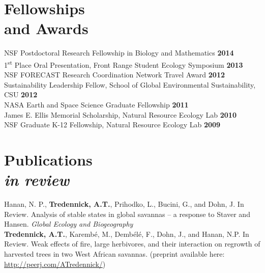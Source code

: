 \documentclass[margin,line]{resume}
\begin{document}
\begin{resume}
    \section{\mysidestyle Fellowships \\and Awards} 
                NSF Postdoctoral Research Fellowship in Biology and Mathematics    \hfill \textbf{2014}\vspace{.5mm}\\%
                1\textsuperscript{st} Place Oral Presentation, Front Range Student Ecology Symposium  \hfill \textbf{2013}\vspace{.5mm}\\%
                NSF FORECAST Research Coordination Network Travel Award \hfill \textbf{2012}\vspace{.5mm}\\%
                Sustainability Leadership Fellow, School of Global Environmental Sustainability, CSU \hfill \textbf{2012}\vspace{.5mm}\\%
		NASA Earth and Space Science Graduate Fellowship  \hfill \textbf{2011}\vspace{.5mm}\\%
		James E. Ellis Memorial Scholarship, Natural Resource Ecology Lab  \hfill \textbf{2010}\vspace{.5mm}\\%
		NSF Graduate K-12 Fellowship, Natural Resource Ecology Lab                        \hfill\textbf{2009}%
   
     \section{\mysidestyle Publications\\ \textsl{\footnotesize in review}}
     	Hanan, N. P., \textbf{Tredennick, A.T.}, Prihodko, L., Bucini, G., and Dohn, J. In Review. Analysis of stable states in global savannas -- a response to Staver and Hansen. \textsl{Global Ecology and Biogeography} \vspace{-6mm}\\%
	
        \textbf{Tredennick, A.T.}, Karemb\'{e}, M., Demb\'{e}l\'{e}, F., Dohn, J., and Hanan, N.P. In Review. Weak effects of fire, large herbivores, and their interaction on regrowth of harvested trees in two West African savannas. (preprint available here: \href{http://peerj.com/ATredennick/}{http://peerj.com/ATredennick/})
        

\end{resume}
\end{document}
